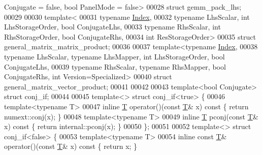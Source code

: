 \begin{DoxyCode}
       Conjugate = false, \textcolor{keywordtype}{bool} PanelMode = false>
00028 \textcolor{keyword}{struct }gemm\_pack\_lhs;
00029 
00030 \textcolor{keyword}{template}<
00031   \textcolor{keyword}{typename} \hyperlink{namespace_eigen_a62e77e0933482dafde8fe197d9a2cfde}{Index},
00032   \textcolor{keyword}{typename} LhsScalar, \textcolor{keywordtype}{int} LhsStorageOrder, \textcolor{keywordtype}{bool} ConjugateLhs,
00033   \textcolor{keyword}{typename} RhsScalar, \textcolor{keywordtype}{int} RhsStorageOrder, \textcolor{keywordtype}{bool} ConjugateRhs,
00034   \textcolor{keywordtype}{int} ResStorageOrder>
00035 \textcolor{keyword}{struct }general\_matrix\_matrix\_product;
00036 
00037 \textcolor{keyword}{template}<\textcolor{keyword}{typename} \hyperlink{namespace_eigen_a62e77e0933482dafde8fe197d9a2cfde}{Index},
00038          \textcolor{keyword}{typename} LhsScalar, \textcolor{keyword}{typename} LhsMapper, \textcolor{keywordtype}{int} LhsStorageOrder, \textcolor{keywordtype}{bool} ConjugateLhs,
00039          \textcolor{keyword}{typename} RhsScalar, \textcolor{keyword}{typename} RhsMapper, \textcolor{keywordtype}{bool} ConjugateRhs, \textcolor{keywordtype}{int} Version=Specialized>
00040 \textcolor{keyword}{struct }general\_matrix\_vector\_product;
00041 
00042 
00043 \textcolor{keyword}{template}<\textcolor{keywordtype}{bool} Conjugate> \textcolor{keyword}{struct }conj\_if;
00044 
00045 \textcolor{keyword}{template}<> \textcolor{keyword}{struct }conj\_if<true> \{
00046   \textcolor{keyword}{template}<\textcolor{keyword}{typename} T>
00047   \textcolor{keyword}{inline} \hyperlink{group___sparse_core___module_class_eigen_1_1_triplet}{T} operator()(\textcolor{keyword}{const} \hyperlink{group___sparse_core___module_class_eigen_1_1_triplet}{T}& x)\textcolor{keyword}{ const }\{ \textcolor{keywordflow}{return} numext::conj(x); \}
00048   \textcolor{keyword}{template}<\textcolor{keyword}{typename} T>
00049   \textcolor{keyword}{inline} \hyperlink{group___sparse_core___module_class_eigen_1_1_triplet}{T} pconj(\textcolor{keyword}{const} \hyperlink{group___sparse_core___module_class_eigen_1_1_triplet}{T}& x)\textcolor{keyword}{ const }\{ \textcolor{keywordflow}{return} internal::pconj(x); \}
00050 \};
00051 
00052 \textcolor{keyword}{template}<> \textcolor{keyword}{struct }conj\_if<false> \{
00053   \textcolor{keyword}{template}<\textcolor{keyword}{typename} T>
00054   \textcolor{keyword}{inline} \textcolor{keyword}{const} \hyperlink{group___sparse_core___module_class_eigen_1_1_triplet}{T}& operator()(\textcolor{keyword}{const} \hyperlink{group___sparse_core___module_class_eigen_1_1_triplet}{T}& x)\textcolor{keyword}{ const }\{ \textcolor{keywordflow}{return} x; \}

\end{DoxyCode}
